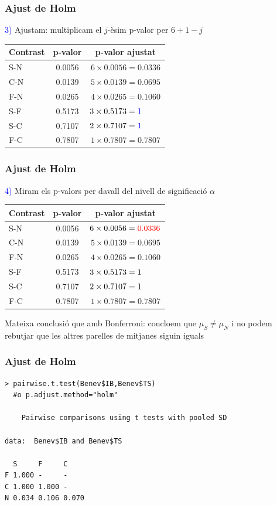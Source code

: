 \documentclass[12pt,t]{beamer}
\newcommand{\red}[1]{\textcolor{red}{#1}}
\newcommand{\blue}[1]{\textcolor{blue}{#1}}
\theoremstyle{plain}
\theoremstyle{definition}
\begin{document}
\begin{frame}
\frametitle{Ajust de Holm}

\blue{3)} Ajustam: multiplicam el $j$-èsim p-valor per $6+1-j$

\begin{center}
\begin{tabular}{l|cc}
Contrast & p-valor & p-valor ajustat\\ \hline
S-N & 0.0056 & $6\times 0.0056=0.0336 $\\
C-N & 0.0139& $5\times 0.0139=0.0695 $\\
F-N & 0.0265& $4\times 0.0265=0.1060 $\\
S-F & 0.5173& $3\times 0.5173=\blue{1}\hphantom{.5519} $\\
S-C & 0.7107& $2\times 0.7107=\blue{1}\hphantom{.5519} $\\
F-C &0.7807& $1\times 0.7807=0.7807$\\
\end{tabular}
\end{center}
\end{frame}


\begin{frame}
\frametitle{Ajust de Holm}

\blue{4)} Miram els p-valors per davall del nivell de significació $\alpha$

\begin{center}
\begin{tabular}{l|cc}
Contrast & p-valor & p-valor ajustat\\ \hline
S-N & 0.0056 & $6\times 0.0056=\red{0.0336} $\\
C-N & 0.0139& $5\times 0.0139=0.0695 $\\
F-N & 0.0265& $4\times 0.0265=0.1060 $\\
S-F & 0.5173& $3\times 0.5173=1\hphantom{.5519} $\\
S-C & 0.7107& $2\times 0.7107=1\hphantom{.5519} $\\
F-C &0.7807& $1\times 0.7807=0.7807$\\
\end{tabular}
\end{center}

Mateixa conclusió que amb Bonferroni: concloem que $\mu_S\neq \mu_N$  i no podem rebutjar que les altres parelles de mitjanes siguin iguals

\end{frame}




\begin{frame}[fragile]
\frametitle{Ajust de Holm}

\begin{lstlisting}
> pairwise.t.test(Benev$IB,Benev$TS)  
  #o p.adjust.method="holm"

	Pairwise comparisons using t tests with pooled SD 

data:  Benev$IB and Benev$TS 

  S     F     C    
F 1.000 -     -    
C 1.000 1.000 -    
N 0.034 0.106 0.070
\end{lstlisting}

\end{frame}
\end{document}
